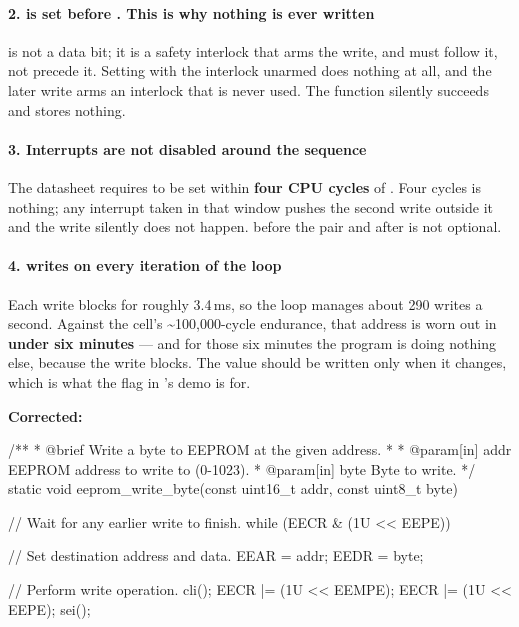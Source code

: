 \paragraph{2.  is set before . This is why nothing is ever written}
 is not a data bit; it is a safety interlock that arms the write, and  must
follow it, not precede it. Setting  with the interlock unarmed does nothing at all, and
the later  write arms an interlock that is never used. The function silently succeeds
and stores nothing.

\paragraph{3. Interrupts are not disabled around the sequence}
The datasheet requires  to be set within \textbf{four CPU cycles} of . Four
cycles is nothing; any interrupt taken in that window pushes the second write outside it and the
write silently does not happen.  before the pair and  after is not optional.

\paragraph{4.  writes on every iteration of the loop}
Each write blocks for roughly 3.4\,ms, so the loop manages about 290 writes a second. Against the
cell's \textasciitilde100,000-cycle endurance, that address is worn out in \textbf{under six
minutes} --- and for those six minutes the program is doing nothing else, because the write blocks.
The value should be written only when it changes, which is what the  flag in
's demo is for.

\textbf{Corrected:}

\begin{ccode}
/**
 * @brief Write a byte to EEPROM at the given address.
 *
 * @param[in] addr EEPROM address to write to (0-1023).
 * @param[in] byte Byte to write.
 */
static void eeprom_write_byte(const uint16_t addr, const uint8_t byte)
{
    // Wait for any earlier write to finish.
    while (EECR & (1U << EEPE)) {}

    // Set destination address and data.
    EEAR = addr;
    EEDR = byte;

    // Perform write operation.
    cli();
    EECR |= (1U << EEMPE);
    EECR |= (1U << EEPE);
    sei();
}
\end{ccode}

